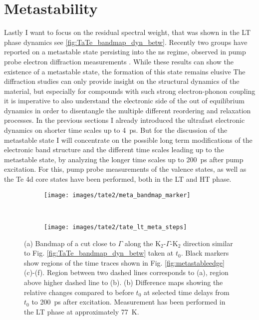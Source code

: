 \section{Metastability}
\label{sec:meta}

Lastly I want to focus on the residual spectral weight, that was shown in the LT phase dynamics see \ref{fig:TaTe_bandmap_dyn_betw}.
Recently two groups have reported on a metastable state persisting into the \unit{\nano\second} regime, observed in pump probe electron diffraction measurements \cite{siddiqui_ultrafast_2021, domrose_femtosecond_2024}.
While these results can show the existence of a metastable state, the formation of this state remains elusive
The diffraction studies can only provide insight on the structural dynamics of the material, but especially for compounds with such strong electron-phonon coupling it is imperative to also understand the electronic side of the out of equilibrium dynamics in order to disentangle the multiple different reordering and relaxation processes.
In the previous sections I already introduced the ultrafast electronic dynamics on shorter time scales up to \qty{4}{\pico\second}.
But for the discussion of the metastable state I will concentrate on the possible long term modifications of the electronic band structure and the different time scales leading up to the metastable state, by analyzing the longer time scales up to \qty{200}{\pico\second} after pump excitation.
For this, pump probe measurements of the valence states, as well as the Te 4d core states have been performed, both in the LT and HT phase.

\begin{figure}[b!]
	\centering
	\begin{subfigure}[b]{0.25\textwidth}
		\texttt{[image: images/tate2/meta\_bandmap\_marker]}
		\caption{}
	\end{subfigure}
	\\
	\begin{subfigure}[b]{\textwidth}
		\texttt{[image: images/tate2/tate\_lt\_meta\_steps]}
		\caption{}
	\end{subfigure}
	\caption{(a) Bandmap of a cut close to $\Gamma$ along the K$_2$-$\Gamma$-K$_2$ direction similar to Fig. \ref{fig:TaTe_bandmap_dyn_betw} taken at $t_0$. Black markers show regions of the time traces shown in Fig. \ref{fig:metastableedge} (c)-(f). Region between two dashed lines corresponds to (a), region above higher dashed line to (b). (b) Difference maps showing the relative changes compared to before $t_0$ at selected time delays from $t_0$ to \qty{200}{\pico\second} after excitation. Measurement has been performed in the LT phase at approximately \qty{77}{\kelvin}.}
	\label{fig:tateltmetasteps}
\end{figure}

